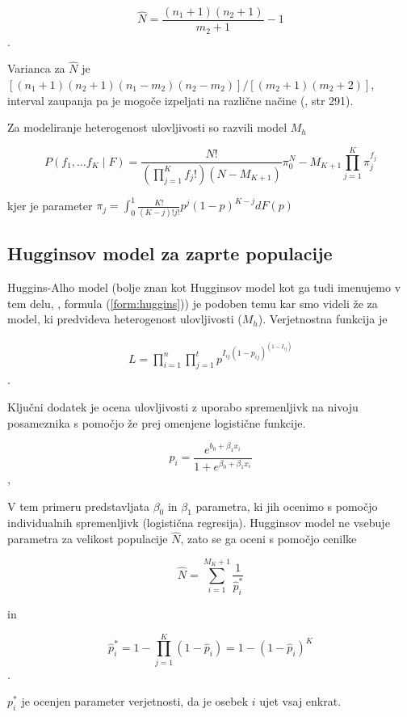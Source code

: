 \[
\hat{N} = \frac{(n_1 + 1)(n_2 + 1)}{m_2 + 1} - 1
\].

Varianca za $\hat{N}$ je $[(n_1 + 1)(n_2 + 1)(n_1 - m_2)(n_2 - m_2)]/[(m_2 + 1)(m_2 + 2)]$, interval zaupanja pa je mogoče izpeljati na različne načine (\citet{williams_analysis_2002}, str 291).

Za modeliranje heterogenost ulovljivosti so razvili model $M_h$ \citep{otis_statistical_1978}

\[
P(f_1, \ldots f_K \mid F) = \frac{N!}{(\prod_{j=1}^{K} f_j !)(N - M_{K+1})} \pi_{0}^N-M_{K+1} \prod_{j=1}^{K} \pi_{j}^{f_j}
\]

kjer je parameter $\pi_j = \int_{0}^{1} \frac{K!}{(K-j)!j!} p^j (1-p)^{K-j} dF(p)$

\subsection{Hugginsov model za zaprte populacije}
Huggins-Alho model (bolje znan kot Hugginsov model kot ga tudi imenujemo v tem delu, \citet{huggins_statistical_1989}, formula (\ref{form:huggins})) je podoben temu kar smo videli že za model, ki predvideva heterogenost ulovljivosti ($M_h$). Verjetnostna funkcija je

\begin{align}
  \label{form:huggins}
L = \prod_{i=1}^{n} \prod_{j=1}^{t} p^{I_{ij} (1 - p_{ij})^(1 - {I_{ij}})}
\end{align}.

Ključni dodatek je ocena ulovljivosti z uporabo spremenljivk na nivoju posameznika s pomočjo že prej omenjene logistične funkcije.

\[
p_i = \frac{e^{b_0 + \beta_1 x_i}}{1 + e^{\beta_0 + \beta_1 x_i}}
\],

V tem primeru predstavljata $\beta_0$ in $\beta_1$ parametra, ki jih ocenimo s pomočjo individualnih spremenljivk (logistična regresija). Hugginsov model ne vsebuje parametra za velikost populacije $\hat{N}$, zato se ga oceni s pomočjo cenilke

\[
\hat{N} = \sum_{i=1}^{M_K + 1} \frac{1}{\hat{p}_{i}^{*}}
\]

in %

\[
\hat{p}_{i}^{*} = 1 - \prod_{j=1}^{K} (1 - \hat{p}_i) = 1- (1 - \hat{p}_i)^K
\].

$p_{i}^{*}$ je ocenjen parameter verjetnosti, da je osebek $i$ ujet vsaj enkrat.

